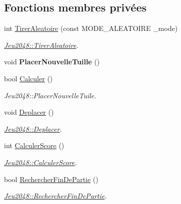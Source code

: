 \subsection*{Fonctions membres privées}
\begin{DoxyCompactItemize}
\item 
int \hyperlink{class_jeu2048_a5ce3049c89c0dcafc7636cfaf710f07f}{Tirer\+Aleatoire} (const M\+O\+D\+E\+\_\+\+A\+L\+E\+A\+T\+O\+I\+RE \+\_\+mode)
\begin{DoxyCompactList}\small\item\em \hyperlink{class_jeu2048_a5ce3049c89c0dcafc7636cfaf710f07f}{Jeu2048\+::\+Tirer\+Aleatoire}. \end{DoxyCompactList}\item 
\mbox{\label{class_jeu2048_ac45529ee4f096637f8b5385670da60eb}} 
void {\bfseries Placer\+Nouvelle\+Tuille} ()
\item 
bool \hyperlink{class_jeu2048_a114d75b40a2eaea021016f8fa609807d}{Calculer} ()
\begin{DoxyCompactList}\small\item\em Jeu2048\+::\+Placer\+Nouvelle\+Tuile. \end{DoxyCompactList}\item 
\mbox{\label{class_jeu2048_a45ab17e9db173e9a0be411c510d37890}} 
void \hyperlink{class_jeu2048_a45ab17e9db173e9a0be411c510d37890}{Deplacer} ()
\begin{DoxyCompactList}\small\item\em \hyperlink{class_jeu2048_a45ab17e9db173e9a0be411c510d37890}{Jeu2048\+::\+Deplacer}. \end{DoxyCompactList}\item 
int \hyperlink{class_jeu2048_ae14335ca8d24df723511355cce5dab81}{Calculer\+Score} ()
\begin{DoxyCompactList}\small\item\em \hyperlink{class_jeu2048_ae14335ca8d24df723511355cce5dab81}{Jeu2048\+::\+Calculer\+Score}. \end{DoxyCompactList}\item 
bool \hyperlink{class_jeu2048_aa894974e64fc2dd2258b81fd975cdeb3}{Rechercher\+Fin\+De\+Partie} ()
\begin{DoxyCompactList}\small\item\em \hyperlink{class_jeu2048_aa894974e64fc2dd2258b81fd975cdeb3}{Jeu2048\+::\+Rechercher\+Fin\+De\+Partie}. \end{DoxyCompactList}\end{DoxyCompactItemize}
